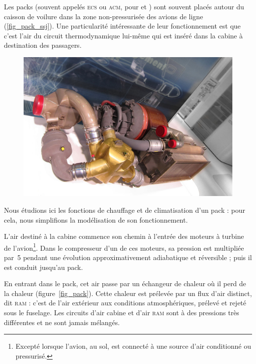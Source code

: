	Les packs (souvent appelés \textsc{ecs} ou \textsc{acm}, pour  et ) sont souvent placés autour du caisson de voilure dans la zone non-pressurisée des avions de ligne (\cref{fig_pack_ssj}). Une particularité intéressante de leur fonctionnement est que c’est l’air du circuit thermodynamique lui-même qui est inséré dans la cabine à destination des passagers.
	
	\begin{figure}
		\begin{center}
			\includegraphics[height=.35\textwidth]{images/liebherr_pack.jpg}
		\end{center}
		\label{fig_pack_c919}
	\end{figure}
	

	Nous étudions ici les fonctions de chauffage et de climatisation d’un pack : pour cela, nous simplifions la modélisation de son fonctionnement.
	
		L’air destiné à la cabine commence son chemin à l’entrée des moteurs à turbine de l’avion\footnote{Excepté lorsque l’avion, au sol, est connecté à une source d’air conditionné ou pressurisé.}. Dans le compresseur d’un de ces moteurs, sa pression est multipliée par~\num{5} pendant une évolution approximativement adiabatique et réversible ; puis il est conduit jusqu’au pack.
	
		En entrant dans le pack, cet air passe par un échangeur de chaleur où il perd de la chaleur (figure~\ref{fig_pack}). Cette chaleur est prélevée par un flux d’air distinct, dit \textsc{ram} : c’est de l’air extérieur aux conditions atmosphériques, prélevé et rejeté sous le fuselage. Les circuits d’air cabine et d’air \textsc{ram} sont à des pressions très différentes et ne sont jamais mélangés.
	
